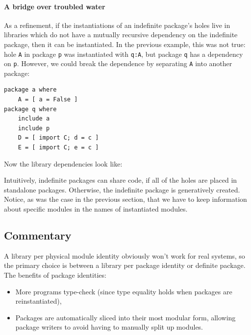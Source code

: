 \documentclass{article}
\begin{document}
\paragraph{A bridge over troubled water} As a refinement, if the
instantiations of an indefinite package's holes live in libraries which
do not have a mutually recursive dependency on the indefinite package,
then it can be instantiated.  In the previous example, this was not
true: hole \verb|A| in package \verb|p| was instantiated with
\verb|q:A|, but package \verb|q| has a dependency on \verb|p|.  However,
we could break the dependence by separating \verb|A| into another
package:

\begin{verbatim}
package a where
    A = [ a = False ]
package q where
    include a
    include p
    D = [ import C; d = c ]
    E = [ import C; e = c ]
\end{verbatim}

Now the library dependencies look like: \\


Intuitively, indefinite packages can share code, if all of the holes are
placed in standalone packages.  Otherwise, the indefinite package is
generatively created.  Notice, as was the case in the previous section,
that we have to keep information about specific modules in the names
of instantiated modules.

\subsection{Commentary}

A library per physical module identity obviously won't work for real systems,
so the primary choice is between a library per package identity or
definite package.  The benefits of package identities:

\begin{itemize}
    \item More programs type-check (since type equality holds when packages
        are reinstantiated),
    \item Packages are automatically sliced into their most modular form,
        allowing package writers to avoid having to manually split up modules.
\end{itemize}
\end{document}
